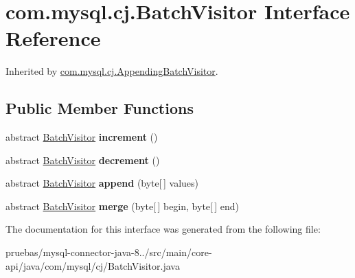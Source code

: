 \hypertarget{interfacecom_1_1mysql_1_1cj_1_1_batch_visitor}{}\section{com.\+mysql.\+cj.\+Batch\+Visitor Interface Reference}
\label{interfacecom_1_1mysql_1_1cj_1_1_batch_visitor}


Inherited by \mbox{\hyperlink{classcom_1_1mysql_1_1cj_1_1_appending_batch_visitor}{com.\+mysql.\+cj.\+Appending\+Batch\+Visitor}}.

\subsection*{Public Member Functions}
\begin{DoxyCompactItemize}
\item 
\mbox{\label{interfacecom_1_1mysql_1_1cj_1_1_batch_visitor_a4778f6e4d4c046653767d232f547c1f2}} 
abstract \mbox{\hyperlink{interfacecom_1_1mysql_1_1cj_1_1_batch_visitor}{Batch\+Visitor}} {\bfseries increment} ()
\item 
\mbox{\label{interfacecom_1_1mysql_1_1cj_1_1_batch_visitor_ad9fc024937c7d03fe39f3c4f1a6a5069}} 
abstract \mbox{\hyperlink{interfacecom_1_1mysql_1_1cj_1_1_batch_visitor}{Batch\+Visitor}} {\bfseries decrement} ()
\item 
\mbox{\label{interfacecom_1_1mysql_1_1cj_1_1_batch_visitor_a7f758e88adb5d36fe9b47dfbee4377a8}} 
abstract \mbox{\hyperlink{interfacecom_1_1mysql_1_1cj_1_1_batch_visitor}{Batch\+Visitor}} {\bfseries append} (byte\mbox{[}$\,$\mbox{]} values)
\item 
\mbox{\label{interfacecom_1_1mysql_1_1cj_1_1_batch_visitor_a29941741b1d70e0845b7164b8141231a}} 
abstract \mbox{\hyperlink{interfacecom_1_1mysql_1_1cj_1_1_batch_visitor}{Batch\+Visitor}} {\bfseries merge} (byte\mbox{[}$\,$\mbox{]} begin, byte\mbox{[}$\,$\mbox{]} end)
\end{DoxyCompactItemize}


The documentation for this interface was generated from the following file\+:\begin{DoxyCompactItemize}
\item 
pruebas/mysql-\/connector-\/java-\/8../src/main/core-\/api/java/com/mysql/cj/Batch\+Visitor.\+java\end{DoxyCompactItemize}
